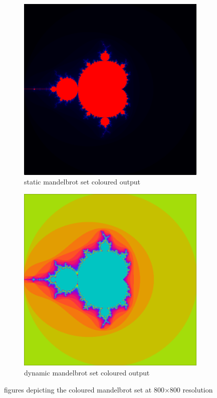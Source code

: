 \documentclass[11pt]{article}
\begin{document}
\begin{figure}
\centering
\begin{subfigure}[t]{0.48\textwidth}
  \centering
    \includegraphics[width=\textwidth]{./images/static.png}
  \caption{static mandelbrot set coloured output}\label{fig:q8s}
\end{subfigure}%
\hfill
\begin{subfigure}[t]{0.48\textwidth}
  \centering
    \includegraphics[width=\textwidth]{./images/dynamic.png}
  \caption{dynamic mandelbrot set coloured output}\label{fig:q8d}
\end{subfigure}%
\caption{figures depicting the coloured mandelbrot set at 800$\times$800 resolution}
\label{fig:outq8}
\end{figure}
\end{document}
